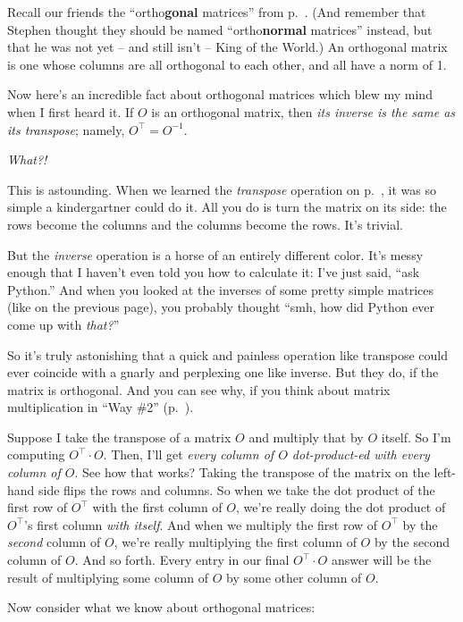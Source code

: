 Recall our friends the ``ortho\textbf{gonal} matrices'' from
p.~\pageref{orthogonalMatrices}. (And remember that Stephen thought they should
be named ``ortho\textbf{normal} matrices'' instead, but that he was not yet --
and still isn't -- King of the World.) An orthogonal matrix is one whose
columns are all orthogonal to each other, and all have a norm of 1.

Now here's an incredible fact about orthogonal matrices which blew my mind when
I first heard it. If $O$ is an orthogonal matrix, then \textit{its inverse is
the same as its transpose}; namely, $O^\intercal = O^{-1}$.

\textit{What?!}

This is astounding. When we learned the \textit{transpose} operation on
p.~\pageref{transpose}, it was so simple a kindergartner could do it. All you
do is turn the matrix on its side: the rows become the columns and the columns
become the rows. It's trivial.

But the \textit{inverse} operation is a horse of an entirely different color.
It's messy enough that I haven't even told you how to calculate it: I've just
said, ``ask Python.'' And when you looked at the inverses of some pretty simple
matrices (like on the previous page), you probably thought ``smh, how did
Python ever come up with \textit{that?}''

So it's truly astonishing that a quick and painless operation like transpose
could ever coincide with a gnarly and perplexing one like inverse. But they do,
if the matrix is orthogonal. And you can see why, if you think about matrix
multiplication in ``Way \#2'' (p.~\pageref{matMultWay2}).

Suppose I take the transpose of a matrix $O$ and multiply that by $O$ itself.
So I'm computing $O^\intercal \cdot O$. Then, I'll get \textit{every column of
$O$ dot-product-ed with every column of $O$}. See how that works? Taking the
transpose of the matrix on the left-hand side flips the rows and columns. So
when we take the dot product of the first row of $O^\intercal$ with the first
column of $O$, we're really doing the dot product of $O^\intercal$'s first
column \textit{with itself}. And when we multiply the first row of
$O^\intercal$ by the \textit{second} column of $O$, we're really multiplying
the first column of $O$ by the second column of $O$. And so forth. Every entry
in our final $O^\intercal \cdot O$ answer will be the result of multiplying
some column of $O$ by some other column of $O$.

Now consider what we know about orthogonal matrices:

